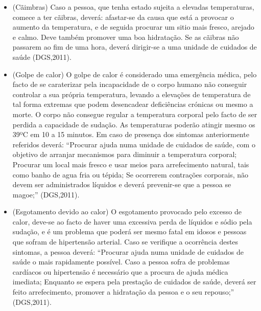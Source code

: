 \documentclass[a4paper,11pt]{report}
\begin{document}
\begin{itemize}
\item (Cãimbras) Caso a pessoa, que tenha estado sujeita a elevadas temperaturas, comece a ter cãibras, deverá: afastar-se da causa que está a provocar o aumento da temperatura, e de seguida procurar um sitio mais fresco, arejado e calmo. Deve também promover uma boa hidratação. Se as cãibras não passarem ao fim de uma hora, deverá dirigir-se a uma unidade de cuidados de saúde (DGS,2011).
\item (Golpe de calor) O golpe de calor é considerado uma emergência médica, pelo facto de se caraterizar pela incapacidade de o corpo humano não conseguir controlar a sua própria temperatura, levando a elevações de temperatura de tal forma extremas que podem desencadear deficiências crónicas ou mesmo a morte. O corpo não consegue regular a temperatura corporal pelo facto de ser perdida a capacidade de sudação. As temperaturas poderão atingir mesmo os 39ºC em 10 a 15 minutos.
Em caso de presença dos sintomas anteriormente referidos deverá: “Procurar ajuda numa unidade de cuidados de saúde, com o objetivo de arranjar mecanismos para diminuir a temperatura corporal; Procurar um local mais fresco e usar meios para arrefecimento natural, tais como banho de agua fria ou tépida; Se ocorrerem contrações corporais, não devem ser administrados líquidos e deverá prevenir-se que a pessoa se magoe;” (DGS,2011).
\item (Esgotamento devido ao calor) O esgotamento provocado pelo excesso de calor, deve-se ao facto de haver uma excessiva perda de líquidos e sódio pela sudação, e é um problema que poderá ser mesmo fatal em idosos e pessoas que sofram de hipertensão arterial.
Caso se verifique a ocorrência destes sintomas, a pessoa deverá: “Procurar ajuda numa unidade de cuidados de saúde o mais rapidamente possível. Caso a pessoa sofra de problemas cardíacos ou hipertensão é necessário que a procura de ajuda médica imediata; Enquanto se espera pela prestação de cuidados de saúde, deverá ser feito arrefecimento, promover a hidratação da pessoa e o seu repouso;” (DGS,2011).
\end{itemize}
\end{document}
